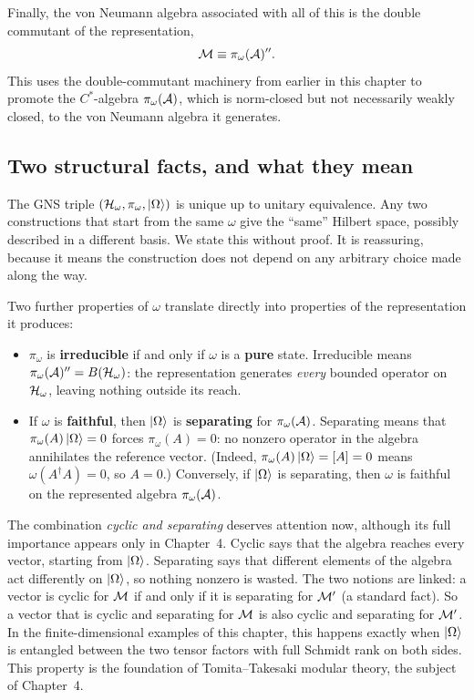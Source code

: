 Finally, the von Neumann algebra associated with all of this is the double commutant of the
representation,
\begin{equation}
\mathcal{M}\equiv\pi_\omega(\mathcal{A})'' .
\label{eq:GNS-vN}
\end{equation}
This uses the double-commutant machinery from earlier in this chapter to promote the $C^*$-algebra
$\pi_\omega(\mathcal{A})$, which is norm-closed but not necessarily weakly closed, to the von Neumann algebra it
generates.

\subsection*{Two structural facts, and what they mean}

The GNS triple $(\mathcal{H}_\omega,\pi_\omega,\ket\Omega)$ is unique up to unitary equivalence. Any two
constructions that start from the same $\omega$ give the ``same'' Hilbert space, possibly described in a
different basis. We state this without proof. It is reassuring, because it means the construction does not
depend on any arbitrary choice made along the way.

Two further properties of $\omega$ translate directly into properties of the representation it produces:

\begin{itemize}
\item $\pi_\omega$ is \textbf{irreducible} if and only if $\omega$ is a \textbf{pure} state. Irreducible
means $\pi_\omega(\mathcal{A})''=B(\mathcal{H}_\omega)$: the representation generates \emph{every} bounded operator on
$\mathcal{H}_\omega$, leaving nothing outside its reach.
\item If $\omega$ is \textbf{faithful}, then $\ket\Omega$ is \textbf{separating} for $\pi_\omega(\mathcal{A})$.
Separating means that $\pi_\omega(A)\ket\Omega=0$ forces $\pi_\omega(A)=0$: no nonzero operator in the algebra
annihilates the reference vector. (Indeed, $\pi_\omega(A)\ket\Omega=[A]=0$ means $\omega(A^\dagger A)=0$, so
$A=0$.) Conversely, if $\ket\Omega$ is separating, then $\omega$ is faithful on the represented algebra
$\pi_\omega(\mathcal{A})$.
\end{itemize}

The combination \emph{cyclic and separating} deserves attention now, although its full importance appears
only in Chapter~4. Cyclic says that the algebra reaches every vector, starting from $\ket\Omega$. Separating
says that different elements of the algebra act differently on $\ket\Omega$, so nothing nonzero is wasted.
The two notions are linked: a vector is cyclic for $\mathcal{M}$ if and only if it is separating for $\mathcal{M}'$ (a standard
fact). So a vector that is cyclic and separating for $\mathcal{M}$ is also cyclic and separating for $\mathcal{M}'$. In the
finite-dimensional examples of this chapter, this happens exactly when $\ket\Omega$ is entangled between the
two tensor factors with full Schmidt rank on both sides. This property is the foundation of Tomita--Takesaki
modular theory, the subject of Chapter~4.

